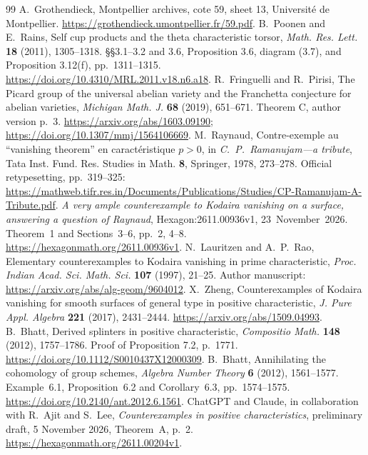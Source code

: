 \documentclass[11pt]{article}
\theoremstyle{remark}\newtheorem{remark}[theorem]{Remark}
\begin{document}
\begin{thebibliography}{99}
\small\setlength{\itemsep}{1pt}
 A.~Grothendieck, Montpellier archives, cote 59, sheet 13, Universit\'e de Montpellier. \url{https://grothendieck.umontpellier.fr/59.pdf}.
 B.~Poonen and E.~Rains, Self cup products and the theta characteristic torsor, \emph{Math. Res. Lett.} \textbf{18} (2011), 1305--1318. \S\S3.1--3.2 and 3.6, Proposition 3.6, diagram (3.7), and Proposition 3.12(f), pp.~1311--1315. \url{https://doi.org/10.4310/MRL.2011.v18.n6.a18}.
 R.~Fringuelli and R.~Pirisi, The Picard group of the universal abelian variety and the Franchetta conjecture for abelian varieties, \emph{Michigan Math. J.} \textbf{68} (2019), 651--671. Theorem C, author version p.~3. \url{https://arxiv.org/abs/1603.09190}; \url{https://doi.org/10.1307/mmj/1564106669}.
 M.~Raynaud, Contre-exemple au ``vanishing theorem'' en caract\'eristique $p>0$, in \emph{C.~P.~Ramanujam---a tribute}, Tata Inst. Fund. Res. Studies in Math. \textbf{8}, Springer, 1978, 273--278. Official retypesetting, pp.~319--325: \url{https://mathweb.tifr.res.in/Documents/Publications/Studies/CP-Ramanujam-A-Tribute.pdf}.
\emph{A very ample counterexample to Kodaira vanishing on a surface,
answering a question of Raynaud},
Hexagon:2611.00936v1, 23~November~2026.
Theorem~1 and Sections~3--6, pp.~2, 4--8.
\url{https://hexagonmath.org/2611.00936v1}.
 N.~Lauritzen and A.~P.~Rao, Elementary counterexamples to Kodaira vanishing in prime characteristic, \emph{Proc. Indian Acad. Sci. Math. Sci.} \textbf{107} (1997), 21--25. Author manuscript: \url{https://arxiv.org/abs/alg-geom/9604012}.
 X.~Zheng, Counterexamples of Kodaira vanishing for smooth surfaces of general type in positive characteristic, \emph{J. Pure Appl. Algebra} \textbf{221} (2017), 2431--2444. \url{https://arxiv.org/abs/1509.04993}.
 B.~Bhatt, Derived splinters in positive characteristic, \emph{Compositio Math.} \textbf{148} (2012), 1757--1786. Proof of Proposition 7.2, p.~1771. \url{https://doi.org/10.1112/S0010437X12000309}.
 B.~Bhatt, Annihilating the cohomology of group schemes, \emph{Algebra Number Theory} \textbf{6} (2012), 1561--1577. Example~6.1, Proposition~6.2 and Corollary~6.3, pp.~1574--1575. \url{https://doi.org/10.2140/ant.2012.6.1561}.
 ChatGPT and Claude, in collaboration with R.~Ajit and S.~Lee, \emph{Counterexamples in positive characteristics}, preliminary draft, 5 November 2026, Theorem~A, p.~2. \url{https://hexagonmath.org/2611.00204v1}.

\end{thebibliography}
\end{document}
